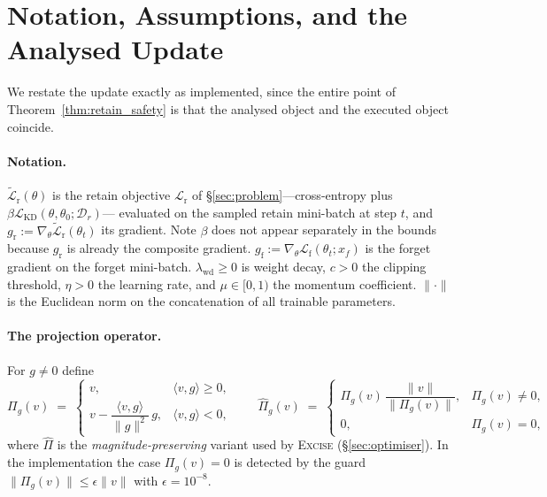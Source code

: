 \documentclass{article}
\newcommand{\ours}{\textsc{Excise}}
\newcommand{\Dr}{\mathcal{D}_r}
\newcommand{\gf}{g_{\mathrm{f}}}
\newcommand{\gr}{g_{\mathrm{r}}}
\newcommand{\lossf}{\mathcal{L}_{\mathrm{f}}}
\newcommand{\lossr}{\mathcal{L}_{\mathrm{r}}}
\newcommand{\losskd}{\mathcal{L}_{\mathrm{KD}}}
\newcommand{\Lrt}{\widetilde{\mathcal{L}}_{\mathrm{r}}}
\newcommand{\rev}[1]{{\color{revisedB}#1}}
\theoremstyle{remark}
\theoremstyle{plain}
\begin{document}
\section{Notation, Assumptions, and the Analysed Update}\label{app:setup}

We restate the update exactly as implemented, since the entire point of
Theorem~\ref{thm:retain_safety} is that the analysed object and the executed
object coincide.

\paragraph{Notation.}
\rev{$\Lrt(\theta)$ is the retain objective $\lossr$ of
\S\ref{sec:problem}---cross-entropy plus $\beta\losskd(\theta,\theta_0;\Dr)$---}%
evaluated on the sampled retain mini-batch at step $t$, and $\gr := \nabla_\theta\Lrt(\theta_t)$ its gradient. Note $\beta$ does not
appear separately in the bounds because $\gr$ is already the composite gradient.
$\gf := \nabla_\theta\lossf(\theta_t;x_f)$ is the forget gradient on the forget
mini-batch. $\lambda_{\mathrm{wd}} \ge 0$ is weight decay, $c>0$ the clipping
threshold, $\eta>0$ the learning rate, and $\mu\in[0,1)$ the momentum
coefficient. $\|\cdot\|$ is the Euclidean norm on the concatenation of all
trainable parameters.

\paragraph{The projection operator.}
For $g \ne 0$ define
\begin{equation}\label{eq:app_proj}
\Pi_{g}(v) \;=\;
\begin{cases}
v, & \langle v,g\rangle \ge 0,\\[2pt]
v - \dfrac{\langle v,g\rangle}{\|g\|^{2}}\,g, & \langle v,g\rangle < 0,
\end{cases}
\qquad
\widehat{\Pi}_{g}(v) \;=\;
\begin{cases}
\Pi_g(v)\,\dfrac{\|v\|}{\|\Pi_g(v)\|}, & \Pi_g(v) \ne 0,\\[4pt]
0, & \Pi_g(v) = 0,
\end{cases}
\end{equation}
where $\widehat{\Pi}$ is the \emph{magnitude-preserving} variant used by \ours{}
(\S\ref{sec:optimiser}). In the implementation the case $\Pi_g(v)=0$ is detected
by the guard $\|\Pi_g(v)\| \le \epsilon\|v\|$ with $\epsilon = 10^{-8}$.
\end{document}
